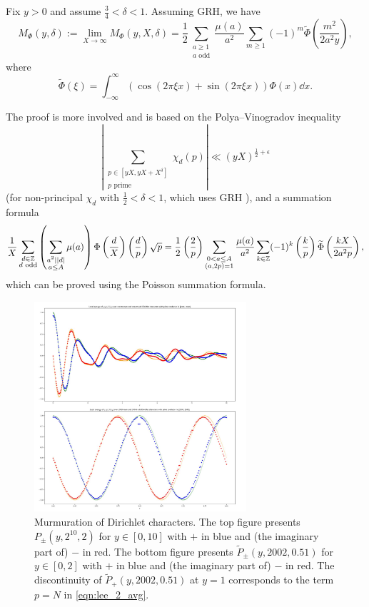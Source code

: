 \begin{theorem}
    Fix $y > 0$ and assume $\frac{3}{4} < \delta < 1$.
    Assuming GRH, we have
    \begin{equation}
        M_{\Phi} (y, \delta) := \lim_{X \to \infty} M_{\Phi}(y, X, \delta) = \frac{1}{2} \sum_{\substack{a \ge 1 \\ a \text{ odd}}} \frac{\mu(a)}{a^2} \sum_{m \ge 1} (-1)^{m} \widetilde{\Phi} \left(\frac{m^2}{2 a^2 y}\right),
    \end{equation}
    where
    \begin{equation}
        \widetilde{\Phi}(\xi) = \int_{-\infty}^{\infty} (\cos(2 \pi \xi x) + \sin(2 \pi \xi x)) \Phi(x) \dd x.
    \end{equation}
\end{theorem}
The proof is more involved and is based on the Polya--Vinogradov inequality 
\[
\left|\sum_{\substack{p \in [yX, yX + X^\delta] \\ p\text{ prime}}} \chi_d(p)\right| \ll (yX)^{\frac{1}{2} + \epsilon}
\]
(for non-principal $\chi_d$ with $\frac{1}{2} < \delta < 1$, which uses GRH \cite{granville2007large}),
and a summation formula
\[
\frac{1}{X} \sum_{\substack{d \in \mathbb{Z} \\ d \text{ odd}}} \left(\sum_{\substack{a^2 \mid |d| \\ a \le A}} \mu(a)\right) \Phi\left(\frac{d}{X}\right) \left(\frac{d}{p}\right) \sqrt{p} = \frac{1}{2} \left(\frac{2}{p}\right) \sum_{\substack{0 < a \le A \\ (a, 2p) = 1}} \frac{\mu(a)}{a^2} \sum_{k \in \mathbb{Z}} (-1)^k \left(\frac{k}{p}\right) \widetilde{\Phi} \left(\frac{k X}{2 a^2 p}\right),
\]
which can be proved using the Poisson summation formula.

\begin{figure}[htp] 
\centering
    \includegraphics[width=0.7\textwidth]{src/lop.png}%
    \caption{Murmuration of Dirichlet characters. The top figure presents $P_{\pm}(y, 2^{10}, 2)$ for $y \in [0, 10]$ with $+$ in blue and (the imaginary part of) $-$ in red. The bottom figure presents $\widetilde{P}_{\pm}(y, 2002, 0.51)$ for $y \in [0, 2]$ with $+$ in blue and (the imaginary part of) $-$ in red. The discontinuity of $\widetilde{P}_{+}(y, 2002, 0.51)$ at $y = 1$ corresponds to the term $p = N$ in \eqref{eqn:lee_2_avg}.}
\label{fig:lop}
\end{figure}